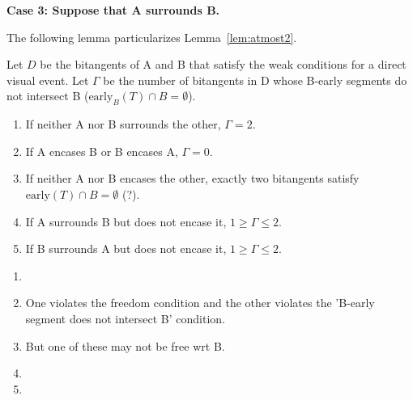 \documentclass[12pt]{article}
\begin{document}

{\bf Case 3: Suppose that A surrounds B.}
\QED

\clearpage

The following lemma particularizes Lemma~\ref{lem:atmost2}.

\begin{lemma}
Let $D$ be the bitangents of A and B that satisfy the weak conditions for a direct visual event.
Let $\Gamma$ be the number of bitangents in D whose B-early segments do not intersect B 
($\mbox{early}_B(T) \cap B = \emptyset$).
\begin{enumerate}
\item
If neither A nor B surrounds the other, $\Gamma = 2$.
\item
If A encases B or B encases A, $\Gamma = 0$.
\item 
If neither A nor B encases the other,
exactly two bitangents satisfy $\mbox{early}(T) \cap B = \emptyset$ (?).
\item 
If A surrounds B but does not encase it, $1 \geq \Gamma \leq 2$.
\item 
If B surrounds A but does not encase it, $1 \geq \Gamma \leq 2$.
\end{enumerate}
\end{lemma}
\prf
\begin{enumerate}
\item
\item
One violates the freedom condition and the other violates the 'B-early segment does not
intersect B' condition.
\item
But one of these may not be free wrt B.
\item
\item
\end{enumerate}
\QED

\clearpage
\end{document}
